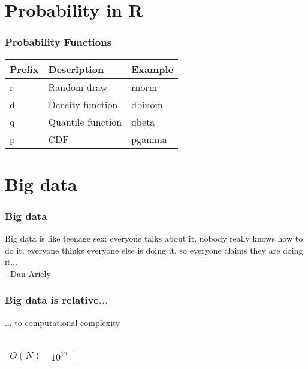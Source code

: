 \documentclass{beamer}
\begin{document}
\section{Probability in R}

\begin{frame}
	\frametitle{Probability Functions}
	\begin{center}
	\begin{table}
		\begin{tabular}{l | l | l}
			\textbf{Prefix} & \textbf{Description} & \textbf{Example}\\
			\hline
			r & Random draw & rnorm \\
			\hline
			d & Density function & dbinom \\
			\hline
			q & Quantile function & qbeta \\
			\hline
			p & CDF & pgamma \\
		\end{tabular}
	\end{table}
\end{center}
\end{frame}

\section{Big data}

\begin{frame}
	\frametitle{Big data}
	Big data is like teenage sex:
	everyone talks about it,
	nobody really knows how to do it,
	everyone thinks everyone else is doing it,
	so everyone claims they are doing it...\\
	- Dan Ariely
\end{frame}

\begin{frame}
	\frametitle{Big data is relative...}
	\begin{center}
		... to computational complexity\\~\\
		\begin{tabular}{ l l }
			$O(N)$ & $10^{12}$ \\
		\end{tabular}
	\end{center}
\end{frame}
\end{document}
